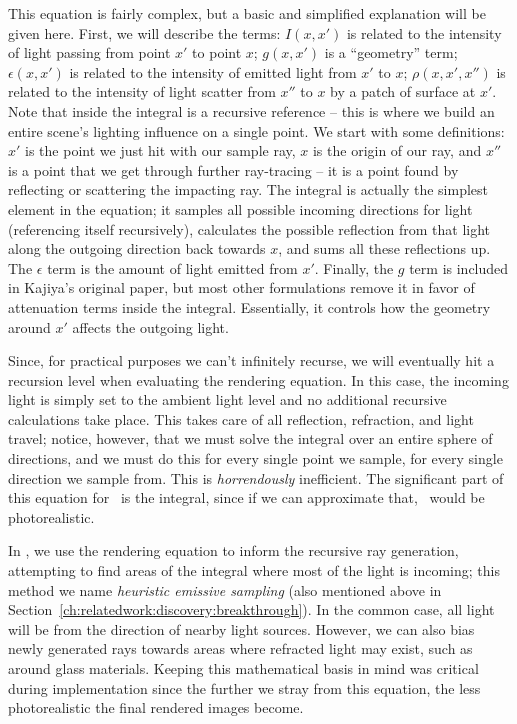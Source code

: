 This equation is fairly complex, but a basic and simplified explanation will be given here.
First, we will describe the terms: $I(x, x')$ is related to the intensity of light passing from point $x'$ to point $x$; $g(x, x')$ is a ``geometry'' term; $\epsilon(x, x')$ is related to the intensity of emitted light from $x'$ to $x$; $\rho(x, x',x'')$ is related to the intensity of light scatter from $x''$ to $x$ by a patch of surface at $x'$.
Note that inside the integral is a recursive reference -- this is where we build an entire scene's lighting influence on a single point.
We start with some definitions: $x'$ is the point we just hit with our sample ray, $x$ is the origin of our ray, and $x''$ is a point that we get through further ray-tracing -- it is a point found by reflecting or scattering the impacting ray.
The integral is actually the simplest element in the equation; it samples all possible incoming directions for light (referencing itself recursively), calculates the possible reflection from that light along the outgoing direction back towards $x$, and sums all these reflections up.
The $\epsilon$ term is the amount of light emitted from $x'$.
Finally, the $g$ term is included in Kajiya's original paper, but most other formulations remove it in favor of attenuation terms inside the integral.
Essentially, it controls how the geometry around $x'$ affects the outgoing light.

Since, for practical purposes we can't infinitely recurse, we will eventually hit a recursion level when evaluating the rendering equation.
In this case, the incoming light is simply set to the ambient light level and no additional recursive calculations take place.
This takes care of all reflection, refraction, and light travel; notice, however, that we must solve the integral over an entire sphere of directions, and we must do this for every single point we sample, for every single direction we sample from.
This is {\it horrendously} inefficient. The significant part of this equation for \name\ is the integral, since if we can approximate that, \name\ would be photorealistic.

In \name, we use the rendering equation to inform the recursive ray generation, attempting to find areas of the integral where most of the light is incoming; this method we name {\it heuristic emissive sampling} (also mentioned above in Section~\ref{ch:relatedwork:discovery:breakthrough}).
In the common case, all light will be from the direction of nearby light sources.
However, we can also bias newly generated rays towards areas where refracted light may exist, such as around glass materials.
Keeping this mathematical basis in mind was critical during implementation since the further we stray from this equation, the less photorealistic the final rendered images become.

